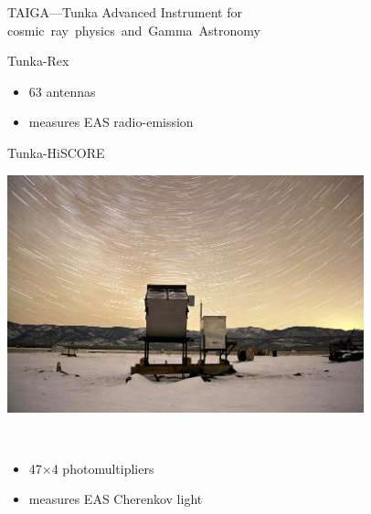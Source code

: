 \begin{frame}{TAIGA---Tunka Advanced Instrument for \mbox{cosmic ray physics and Gamma Astronomy}}
\begin{minipage}[t]{0.31\textwidth}
\begin{block}{\small Tunka-Rex}
{    }
    \\
    \parbox[c][0.15\textheight][t]{1\textwidth}{
      \begin{itemize}
        \setlength{\itemsep}{0pt}
        \item 63 antennas
        \item measures EAS radio-emission
      \end{itemize}
    }
  \end{block}
\end{minipage}
\hfill
\begin{minipage}[t]{0.31\textwidth}
  \begin{block}{\small Tunka-HiSCORE}
    \parbox[c][0.20\textheight][t]{1\textwidth}{
      \centering
      \includegraphics[width=0.7742\textwidth]{pics/Tunka-HiSCORE.jpg}
    }
    \\
    \parbox[c][0.15\textheight][t]{1.1\textwidth}{
      \begin{itemize}
        \setlength{\itemsep}{0pt}
        \item 47$\times$4 photomultipliers
        \item measures EAS Cherenkov light
      \end{itemize}
    }
  \end{block}
\end{minipage}


\end{frame}
